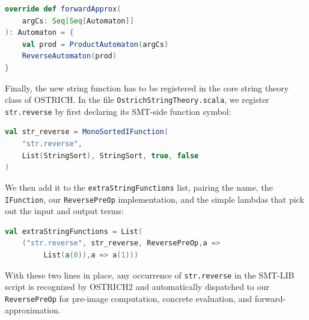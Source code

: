 \begin{lstlisting}[language=Scala]
override def forwardApprox(
	argCs: Seq[Seq[Automaton]]
): Automaton = {
	val prod = ProductAutomaton(argCs)
	ReverseAutomaton(prod)
}
\end{lstlisting}
%
%
%
%
%
%


Finally, the new string function has to be registered in the core
string theory class of OSTRICH.
In the file \texttt{OstrichStringTheory.scala}, we register \texttt{str.reverse} by first declaring its SMT-side function symbol:

\begin{lstlisting}[language=Scala]
val str_reverse = MonoSortedIFunction(
	"str.reverse",
	List(StringSort), StringSort, true, false
)
\end{lstlisting}

We then add it to the \texttt{extraStringFunctions} list, pairing the name, the \texttt{IFunction}, our \texttt{ReversePreOp} implementation, and the simple lambdas that pick out the input and output terms:

\begin{lstlisting}[language=Scala]
val extraStringFunctions = List(
	("str.reverse", str_reverse, ReversePreOp,a =>
		 List(a(0)),a => a(1)))
\end{lstlisting}

With these two lines in place, any occurrence of \texttt{str.reverse} in the SMT-LIB script is recognized by OSTRICH2 and automatically dispatched to our \texttt{ReversePreOp} for pre-image computation, concrete evaluation, and forward-approximation.


